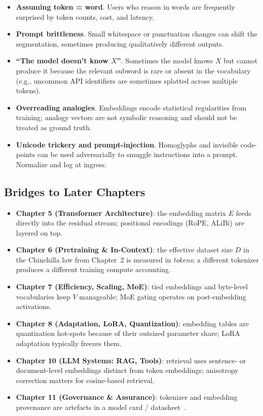 \begin{itemize}
  \item \textbf{Assuming token = word}. Users who reason in words are
        frequently surprised by token counts, cost, and latency.
  \item \textbf{Prompt brittleness}. Small whitespace or punctuation
        changes can shift the segmentation, sometimes producing
        qualitatively different outputs.
  \item \textbf{``The model doesn't know $X$''}. Sometimes the model
        knows $X$ but cannot produce it because the relevant subword
        is rare or absent in the vocabulary (e.g., uncommon API
        identifiers are sometimes splatted across multiple tokens).
  \item \textbf{Overreading analogies}. Embeddings encode statistical
        regularities from training; analogy vectors are not symbolic
        reasoning and should not be treated as ground truth.
  \item \textbf{Unicode trickery and prompt-injection}. Homoglyphs and
        invisible code-points can be used adversarially to smuggle
        instructions into a prompt. Normalize and log at ingress.
\end{itemize}

\subsection{Bridges to Later Chapters}

\begin{itemize}
  \item \textbf{Chapter 5 (Transformer Architecture)}: the embedding
        matrix $E$ feeds directly into the residual stream; positional
        encodings (RoPE, ALiBi) are layered on top.
  \item \textbf{Chapter 6 (Pretraining \& In-Context)}: the effective
        dataset size $D$ in the Chinchilla law from Chapter~2 is measured
        in \emph{tokens}; a different tokenizer produces a different
        training compute accounting.
  \item \textbf{Chapter 7 (Efficiency, Scaling, MoE)}: tied embeddings
        and byte-level vocabularies keep $V$ manageable; MoE gating
        operates on post-embedding activations.
  \item \textbf{Chapter 8 (Adaptation, LoRA, Quantization)}: embedding
        tables are quantization hot-spots because of their outsized
        parameter share; LoRA adaptation typically freezes them.
  \item \textbf{Chapter 10 (LLM Systems: RAG, Tools)}: retrieval uses
        sentence- or document-level embeddings distinct from token
        embeddings; anisotropy correction matters for cosine-based
        retrieval.
  \item \textbf{Chapter 11 (Governance \& Assurance)}: tokenizer and
        embedding provenance are artefacts in a model card /
        datasheet~\citep{mitchell2019modelcards,gebru2021datasheets}.
\end{itemize}

